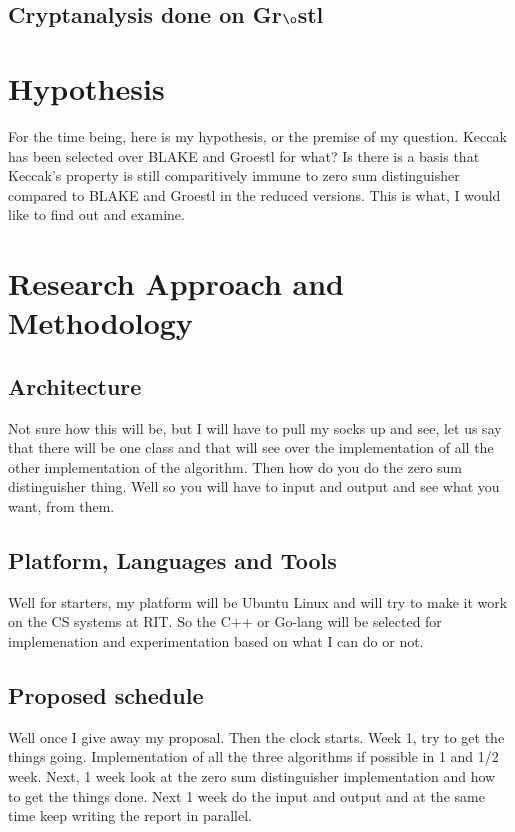 \documentclass[12pt]{artikel3}                  %
\begin{document}
  \subsection{Cryptanalysis done on Gr$\o$stl}

\section{Hypothesis}
For the time being, here is my hypothesis, or the premise of my question. Keccak has been selected over BLAKE and
Groestl for what? Is there is a basis that Keccak's property is still comparitively immune to zero sum distinguisher
compared to BLAKE and Groestl in the reduced versions. This is what, I would like to find out and examine.  

\section{Research Approach and Methodology}

  \subsection{Architecture}
  Not sure how this will be, but I will have to pull my socks up and see, let us say that there will be one class
  and that will see over the implementation of all the other implementation of the algorithm. Then how do you do the
  zero sum distinguisher thing. Well so you will have to input and output and see what you want, from them.

  \subsection{Platform, Languages and Tools}
  Well for starters, my platform will be Ubuntu Linux and will try to make it work on the CS systems at RIT. So the
  C++ or Go-lang will be selected for implemenation and experimentation based on what I can do or not.

  \subsection{Proposed schedule}
  Well once I give away my proposal. Then the clock starts. Week 1, try to get the things going. Implementation of all
  the three algorithms if possible in 1 and 1/2 week. Next, 1 week look at the zero sum distinguisher implementation
  and how to get the things done. Next 1 week do the input and output and at the same time keep writing the report in
  parallel.
\end{document}
